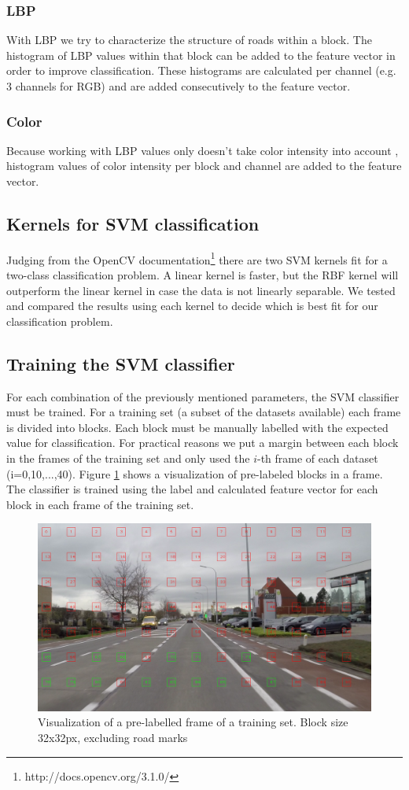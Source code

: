 \documentclass[runningheads,a4paper]{llncs}
\begin{document}
\subsubsection{LBP}
With LBP we try to characterize the structure of roads within a block. The histogram of LBP values within that block can be added to the feature vector in order to improve classification. These histograms are calculated per channel (e.g. 3 channels for RGB) and are added consecutively to the feature vector. 


\subsubsection{Color}
Because working with LBP values only doesn't take color intensity into account \cite{Pietikainen2002}, histogram values of color intensity per block and channel are added to the feature vector. 

\subsection{Kernels for SVM classification}\label{methods-kernels}
Judging from the OpenCV documentation\footnote{http://docs.opencv.org/3.1.0/} there are two SVM kernels fit for a two-class classification problem.
A linear kernel is faster, but the RBF kernel will outperform the linear kernel in case the data is not linearly separable. We tested and compared the results using each kernel to decide which is best fit for our classification problem.

\subsection{Training the SVM classifier}
For each combination of the previously mentioned parameters, the SVM classifier must be trained. For a training set (a subset of the datasets available) each frame is divided into blocks. Each block must be manually labelled with the expected value for classification. For practical reasons we put a margin between each block in the frames of the training set and only used the $i$-th frame of each dataset (i=0,10,...,40).
Figure \ref{fig:frame-training} shows a visualization of pre-labeled blocks in a frame.
The classifier is trained using the label and calculated feature vector for each block in each frame of the training set.

\begin{figure}[ht]
\centering
  \centering
  \includegraphics[width=.7\textwidth]{fig/svm_training_32.png}
\caption{Visualization of a pre-labelled frame of a training set. Block size 32x32px, excluding road marks}
\label{fig:frame-training}
\end{figure}
\end{document}
